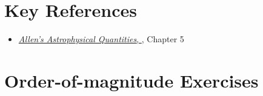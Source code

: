 
\section{Key References}

\begin{itemize}
  \item
    \href{http://adsabs.harvard.edu/abs/2000asqu.book.....C}{
    {\it Allen's Astrophysical Quantities},
      \citet{cox00a}}, Chapter 5
\end{itemize}

\section{Order-of-magnitude Exercises}

